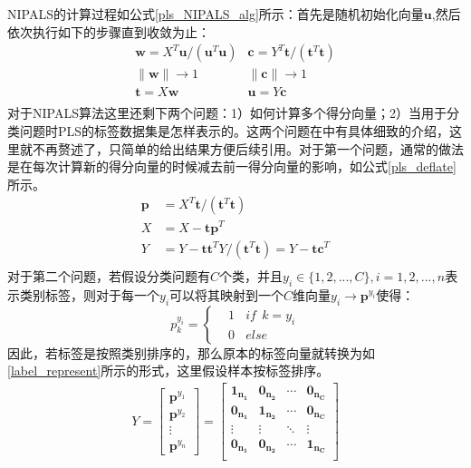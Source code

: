 NIPALS的计算过程如公式\ref{pls_NIPALS_alg}所示：首先是随机初始化向量$\bm{u}$,然后依次执行如下的步骤直到收敛为止：
\begin{equation}
\label{pls_NIPALS_alg}
\begin{array}{cc}
\bm{w}={X^{T}\bm{u}/(\bm{u}^{T}\bm{u})} &\bm{c}={Y^{T}\bm{t}/(\bm{t}^{T}\bm{t})}\\
\|\bm{w}\|\rightarrow 1 &\|\bm{c}\|\rightarrow 1\\
\bm{t}=X\bm{w} &\bm{u}=Y\bm{c}\\
\end{array}
\end{equation}
对于NIPALS算法这里还剩下两个问题：1）如何计算多个得分向量；2）当用于分类问题时PLS的标签数据集是怎样表示的。这两个问题在\cite{pls_PLSALL}中有具体细致的介绍，这里就不再赘述了，只简单的给出结果方便后续引用。对于第一个问题，通常的做法是在每次计算新的得分向量的时候减去前一得分向量的影响，如公式\ref{pls_deflate}所示。
\begin{equation}
\label{pls_deflate}
\begin{split}
\bm{p}&=X^{T}\bm{t}/(\bm{t}^{T}\bm{t})\\
X&=X-\bm{tp}^{T}\\
Y&=Y-\bm{tt}^{T}Y/(\bm{t}^{T}\bm{t})=Y-\bm{tc}^{T}\\
\end{split}
\end{equation}
对于第二个问题，若假设分类问题有$C$个类，并且$y_i \in \{1,2,...,C\},i=1,2,...,n$表示类别标签，则对于每一个$y_i$可以将其映射到一个$C$维向量$y_i \rightarrow \bm{p}^{y_i}$使得：
\begin{displaymath}
p^{y_i}_{k}=\left\{
\begin{aligned}
&1~~~~if~~k=y_i\\
&0~~~~else
\end{aligned}
\right.
\end{displaymath}
因此，若标签是按照类别排序的，那么原本的标签向量就转换为如\ref{label_represent}所示的形式，这里假设样本按标签排序。
\begin{equation}
\label{label_represent}
\begin{split}
{Y}=\left[
\begin{array}{c}
\bm{p}^{y_1}\\
\bm{p}^{y_2}\\
\vdots\\
\bm{p}^{y_n}
\end{array}
\right]=\left[
\begin{array}{cccc}
\bm{1_{n_1}}&\bm{0_{n_2}}&\cdots&\bm{0_{n_C}}\\
\bm{0_{n_1}}&\bm{1_{n_2}}&\cdots&\bm{0_{n_C}}\\
\vdots&\vdots&\ddots&\vdots\\
\bm{0_{n_1}}&\bm{0_{n_2}}&\cdots&\bm{1_{n_C}}\\
\end{array}
\right]
\end{split}
\end{equation}
